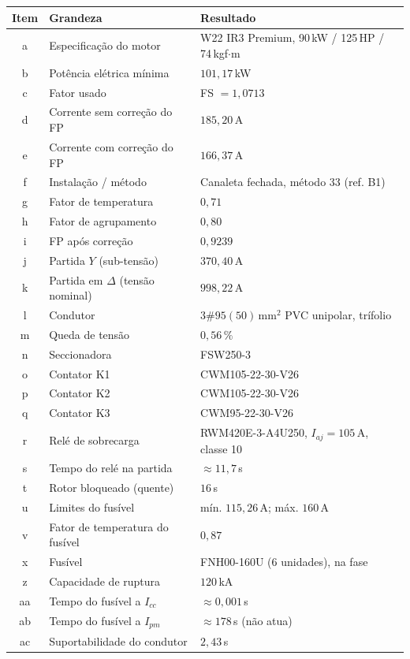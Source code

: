 \documentclass[11pt,a4paper]{article}
\begin{document}
\begin{tabularx}{\linewidth}{@{}clX@{}}
\toprule
Item & Grandeza & Resultado \\
\midrule
a & Especifica\c{c}\~ao do motor & W22 IR3 Premium, 90\,kW / 125\,HP / 74\,kgf$\cdot$m \\
b & Pot\^encia el\'etrica m\'inima & $101{,}17$\,kW \\
c & Fator usado & FS $=1{,}0713$ \\
d & Corrente sem corre\c{c}\~ao do FP & $185{,}20$\,A \\
e & Corrente com corre\c{c}\~ao do FP & $166{,}37$\,A \\
f & Instala\c{c}\~ao / m\'etodo & Canaleta fechada, m\'etodo 33 (ref. B1) \\
g & Fator de temperatura & $0{,}71$ \\
h & Fator de agrupamento & $0{,}80$ \\
i & FP ap\'os corre\c{c}\~ao & $0{,}9239$ \\
j & Partida $Y$ (sub-tens\~ao) & $370{,}40$\,A \\
k & Partida em $\Delta$ (tens\~ao nominal) & $998{,}22$\,A \\
l & Condutor & $3\#95(50)$\,mm$^2$ PVC unipolar, tr\'ifolio \\
m & Queda de tens\~ao & $0{,}56\,\%$ \\
n & Seccionadora & FSW250-3 \\
o & Contator K1 & CWM105-22-30-V26 \\
p & Contator K2 & CWM105-22-30-V26 \\
q & Contator K3 & CWM95-22-30-V26 \\
r & Rel\'e de sobrecarga & RWM420E-3-A4U250, $I_{aj}=105$\,A, classe 10 \\
s & Tempo do rel\'e na partida & $\approx 11{,}7$\,s \\
t & Rotor bloqueado (quente) & $16$\,s \\
u & Limites do fus\'ivel & m\'in. $115{,}26$\,A; m\'ax. $160$\,A \\
v & Fator de temperatura do fus\'ivel & $0{,}87$ \\
x & Fus\'ivel & FNH00-160U (6 unidades), na fase \\
z & Capacidade de ruptura & $120$\,kA \\
aa & Tempo do fus\'ivel a $I_{cc}$ & $\approx 0{,}001$\,s \\
ab & Tempo do fus\'ivel a $I_{pm}$ & $\approx 178$\,s (n\~ao atua) \\
ac & Suportabilidade do condutor & $2{,}43$\,s \\
\bottomrule
\end{tabularx}
\end{document}
